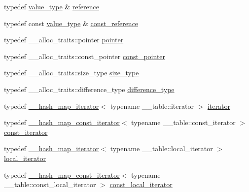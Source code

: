 \begin{DoxyCompactItemize}
\item 
typedef \hyperlink{classunordered__multimap_a106d390dc0deafc47f10d3943b247ee6}{value\+\_\+type} \& \hyperlink{classunordered__multimap_a0c14a599081fd7cef3adfd73572a78be}{reference}
\item 
typedef const \hyperlink{classunordered__multimap_a106d390dc0deafc47f10d3943b247ee6}{value\+\_\+type} \& \hyperlink{classunordered__multimap_ab3aedd41dcc9c645d596c98ba3379826}{const\+\_\+reference}
\item 
typedef \+\_\+\+\_\+alloc\+\_\+traits\+::pointer \hyperlink{classunordered__multimap_ace9882ddb645e0c73785f46e8c0fc9f4}{pointer}
\item 
typedef \+\_\+\+\_\+alloc\+\_\+traits\+::const\+\_\+pointer \hyperlink{classunordered__multimap_ac431051a949a339b15eb3c6f0ff5dccf}{const\+\_\+pointer}
\item 
typedef \+\_\+\+\_\+alloc\+\_\+traits\+::size\+\_\+type \hyperlink{classunordered__multimap_a977c4093df6d4d0302f280de19af4b58}{size\+\_\+type}
\item 
typedef \+\_\+\+\_\+alloc\+\_\+traits\+::difference\+\_\+type \hyperlink{classunordered__multimap_ae01816b9f8883bc381dee433486054de}{difference\+\_\+type}
\item 
typedef \hyperlink{class____hash__map__iterator}{\+\_\+\+\_\+hash\+\_\+map\+\_\+iterator}$<$ typename \+\_\+\+\_\+table\+::iterator $>$ \hyperlink{classunordered__multimap_a7b508cae41ac3a258ca80609ec43db47}{iterator}
\item 
typedef \hyperlink{class____hash__map__const__iterator}{\+\_\+\+\_\+hash\+\_\+map\+\_\+const\+\_\+iterator}$<$ typename \+\_\+\+\_\+table\+::const\+\_\+iterator $>$ \hyperlink{classunordered__multimap_a3cb373bd19680f9933781c04905fde39}{const\+\_\+iterator}
\item 
typedef \hyperlink{class____hash__map__iterator}{\+\_\+\+\_\+hash\+\_\+map\+\_\+iterator}$<$ typename \+\_\+\+\_\+table\+::local\+\_\+iterator $>$ \hyperlink{classunordered__multimap_a672fd63d94f807d130e2026d2863d40c}{local\+\_\+iterator}
\item 
typedef \hyperlink{class____hash__map__const__iterator}{\+\_\+\+\_\+hash\+\_\+map\+\_\+const\+\_\+iterator}$<$ typename \+\_\+\+\_\+table\+::const\+\_\+local\+\_\+iterator $>$ \hyperlink{classunordered__multimap_a4813834c894681f449b5afe718336482}{const\+\_\+local\+\_\+iterator}
\end{DoxyCompactItemize}
